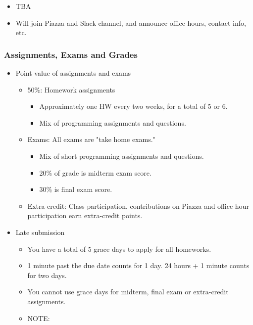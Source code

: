 \documentclass[11pt]{article}
\providecommand{\tightlist}{%
      \setlength{\itemsep}{0pt}\setlength{\parskip}{0pt}}
\begin{document}
\begin{itemize}
\begin{itemize}
    \begin{itemize}
    \tightlist
    \item
      TBA
    \item
      Will join Piazza and Slack channel, and announce office hours,
      contact info, etc.
    \end{itemize}
  \end{itemize}
\end{itemize}

    \subsubsection{Assignments, Exams and
Grades}\label{assignments-exams-and-grades}

\begin{itemize}
\tightlist
\item
  Point value of assignments and exams

  \begin{itemize}
  \tightlist
  \item
    50\%: Homework assignments

    \begin{itemize}
    \tightlist
    \item
      Approximately one HW every two weeks, for a total of 5 or 6.
    \item
      Mix of programming assignments and questions.
    \end{itemize}
  \item
    Exams: All exams are "take home exams."

    \begin{itemize}
    \tightlist
    \item
      Mix of short programming assignments and questions.
    \item
      20\% of grade is midterm exam score.
    \item
      30\% is final exam score.
    \end{itemize}
  \item
    Extra-credit: Class participation, contributions on Piazza and
    office hour participation earn extra-credit points.
  \end{itemize}
\item
  Late submission

  \begin{itemize}
  \tightlist
  \item
    You have a total of 5 grace days to apply for all homeworks.
  \item
    1 minute past the due date counts for 1 day. 24 hours + 1 minute
    counts for two days.
  \item
    You cannot use grace days for midterm, final exam or extra-credit
    assignments.
  \item
    NOTE:


\end{itemize}
\end{itemize}
\end{document}
